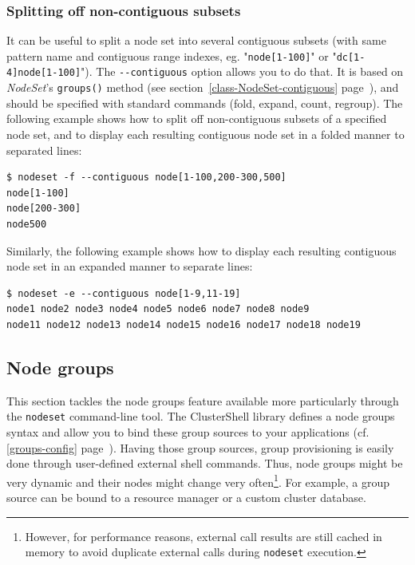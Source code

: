 \documentclass[english,a4paper]{csuserguide}
\newcommand{\NodeSet}{\textit{NodeSet}\xspace}
\newcommand{\nodeset}{\texttt{nodeset}\xspace}
\begin{document}
\subsubsection{Splitting off non-contiguous subsets}
\label{nodeset-splitting-contiguous}
It can be useful to split a node set into several contiguous subsets (with same pattern name and contiguous range indexes, eg. "\verb+node[1-100]+" or "\verb+dc[1-4]node[1-100]+"). The \verb+--contiguous+ option allows you to do that. It is based on \NodeSet's \lstinline+groups()+ method (see section~\ref{class-NodeSet-contiguous} page~\pageref{class-NodeSet-contiguous}), and should be specified with standard commands (fold, expand, count, regroup). The following example shows how to split   off non-contiguous subsets of a specified node set, and to display each resulting contiguous node set in a folded manner to separated lines:
\bigskip

\begin{lstlisting}[breaklines=true, breakatwhitespace=true]
$ nodeset -f --contiguous node[1-100,200-300,500]
node[1-100]
node[200-300]
node500
\end{lstlisting}

Similarly, the following example shows how to display each resulting contiguous node set in an expanded manner to separate lines:
\bigskip

\begin{lstlisting}[breaklines=true, breakatwhitespace=true]
$ nodeset -e --contiguous node[1-9,11-19]
node1 node2 node3 node4 node5 node6 node7 node8 node9
node11 node12 node13 node14 node15 node16 node17 node18 node19
\end{lstlisting}


\subsection{Node groups}
\label{nodeset-groups}

This section tackles the node groups feature available more particularly through the \nodeset command-line tool. The ClusterShell library defines a node groups syntax and allow you to bind these group sources to your applications (cf. \ref{groups-config} page~\pageref{groups-config}). Having those group sources, group provisioning is easily done through user-defined external shell commands. Thus, node groups might be very dynamic and their nodes might change very often\footnote{However, for performance reasons, external call results are still cached in memory to avoid duplicate external calls during \lstinline+nodeset+ execution.}. For example, a group source can be bound to a resource manager or a custom cluster database.
\end{document}
